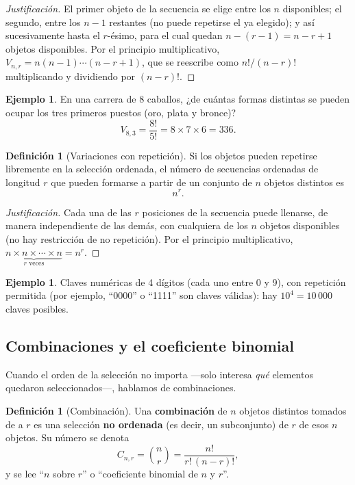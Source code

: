 \documentclass[11pt,a4paper]{article}
\theoremstyle{plain}
\theoremstyle{definition}
\newtheorem{definicion}[teorema]{Definición}
\newtheorem{ejemplo}[teorema]{Ejemplo}
\theoremstyle{remark}
\begin{document}
\begin{proof}[Justificación]
El primer objeto de la secuencia se elige entre los $n$ disponibles; el segundo, entre los $n-1$ restantes (no puede repetirse el ya elegido); y así sucesivamente hasta el $r$-ésimo, para el cual quedan $n-(r-1) = n-r+1$ objetos disponibles. Por el principio multiplicativo, $V_{n,r} = n(n-1)\cdots(n-r+1)$, que se reescribe como $n!/(n-r)!$ multiplicando y dividiendo por $(n-r)!$.
\end{proof}

\begin{ejemplo}
En una carrera de 8 caballos, ¿de cuántas formas distintas se pueden ocupar los tres primeros puestos (oro, plata y bronce)?
\[
V_{8,3} = \frac{8!}{5!} = 8\times7\times6 = 336.
\]
\end{ejemplo}

\begin{definicion}[Variaciones con repetición]
Si los objetos pueden repetirse libremente en la selección ordenada, el número de secuencias ordenadas de longitud $r$ que pueden formarse a partir de un conjunto de $n$ objetos distintos es
\[
n^r.
\]
\end{definicion}

\begin{proof}[Justificación]
Cada una de las $r$ posiciones de la secuencia puede llenarse, de manera independiente de las demás, con cualquiera de los $n$ objetos disponibles (no hay restricción de no repetición). Por el principio multiplicativo, $\underbrace{n\times n\times\cdots\times n}_{r \text{ veces}} = n^r$.
\end{proof}

\begin{ejemplo}
Claves numéricas de 4 dígitos (cada uno entre 0 y 9), con repetición permitida (por ejemplo, ``0000'' o ``1111'' son claves válidas): hay $10^4 = 10\,000$ claves posibles.
\end{ejemplo}

\subsection{Combinaciones y el coeficiente binomial}

Cuando el orden de la selección no importa —solo interesa \emph{qué} elementos quedaron seleccionados—, hablamos de combinaciones.

\begin{definicion}[Combinación]
Una \textbf{combinación} de $n$ objetos distintos tomados de a $r$ es una selección \textbf{no ordenada} (es decir, un subconjunto) de $r$ de esos $n$ objetos. Su número se denota
\[
C_{n,r} = \binom{n}{r} = \frac{n!}{r!\,(n-r)!},
\]
y se lee ``$n$ sobre $r$'' o ``coeficiente binomial de $n$ y $r$''.
\end{definicion}
\end{document}
